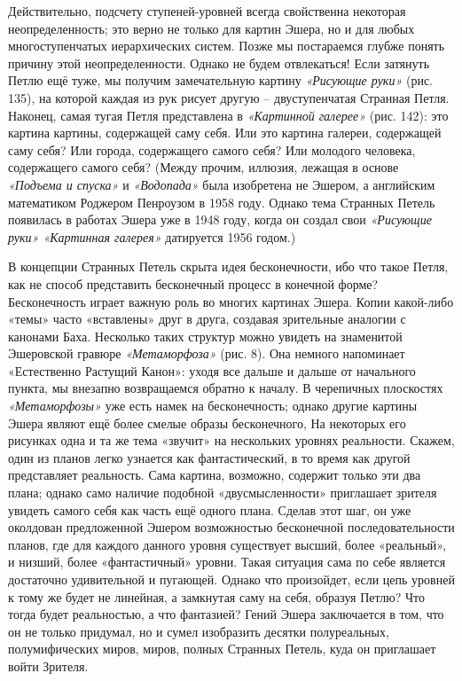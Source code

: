 \documentclass[../main.tex]{subfiles}
\begin{document}
Действительно, подсчету ступеней-уровней всегда свойственна некоторая неопределенность; это верно не только для картин Эшера, но и для любых многоступенчатых иерархических систем. Позже мы постараемся глубже понять причину этой неопределенности. Однако не будем отвлекаться! Если затянуть Петлю ещё туже, мы получим замечательную картину \emph{«Рисующие руки»} (рис. 135), на которой каждая из рук рисует другую \--- двуступенчатая Странная Петля. Наконец, самая тугая Петля представлена в \emph{«Картинной галерее»} (рис. 142): это картина картины, содержащей саму себя. Или это картина галереи, содержащей саму себя? Или города, содержащего самого себя? Или молодого человека, содержащего самого себя? (Между прочим, иллюзия, лежащая в основе \emph{«Подъема и спуска»} и \emph{«Водопада»} была изобретена не Эшером, а английским математиком Роджером Пенроузом в 1958 году. Однако тема Странных Петель появилась в работах Эшера уже в 1948 году, когда он создал свои \emph{«Рисующие руки» «Картинная галерея»} датируется 1956 годом.)

В концепции Странных Петель скрыта идея бесконечности, ибо что такое Петля, как не способ представить бесконечный процесс в конечной форме? Бесконечность играет важную роль во многих картинах Эшера. Копии какой-либо «темы» часто «вставлены» друг в друга, создавая зрительные аналогии с канонами Баха. Несколько таких структур можно увидеть на знаменитой Эшеровской гравюре \emph{«Метаморфоза»} (рис. 8). Она немного напоминает «Естественно Растущий Канон»: уходя все дальше и дальше от начального пункта, мы внезапно возвращаемся обратно к началу. В черепичных плоскостях \emph{«Метаморфозы»} уже есть намек на бесконечность; однако другие картины Эшера являют ещё более смелые образы бесконечного, На некоторых его рисунках одна и та же тема «звучит» на нескольких уровнях реальности. Скажем, один из планов легко узнается как фантастический, в то время как другой представляет реальность. Сама картина, возможно, содержит только эти два плана; однако само наличие подобной «двусмысленности» приглашает зрителя увидеть самого себя как часть ещё одного плана. Сделав этот шаг, он уже околдован предложенной Эшером возможностью бесконечной последовательности планов, где для каждого данного уровня существует высший, более «реальный», и низший, более «фантастичный» уровни. Такая ситуация сама по себе является достаточно удивительной и пугающей. Однако что произойдет, если цепь уровней к тому же будет не линейная, а замкнутая саму на себя, образуя Петлю? Что тогда будет реальностью, а что фантазией? Гений Эшера заключается в том, что он не только придумал, но и сумел изобразить десятки полуреальных, полумифических миров, миров, полных Странных Петель, куда он приглашает войти Зрителя.
\end{document}
